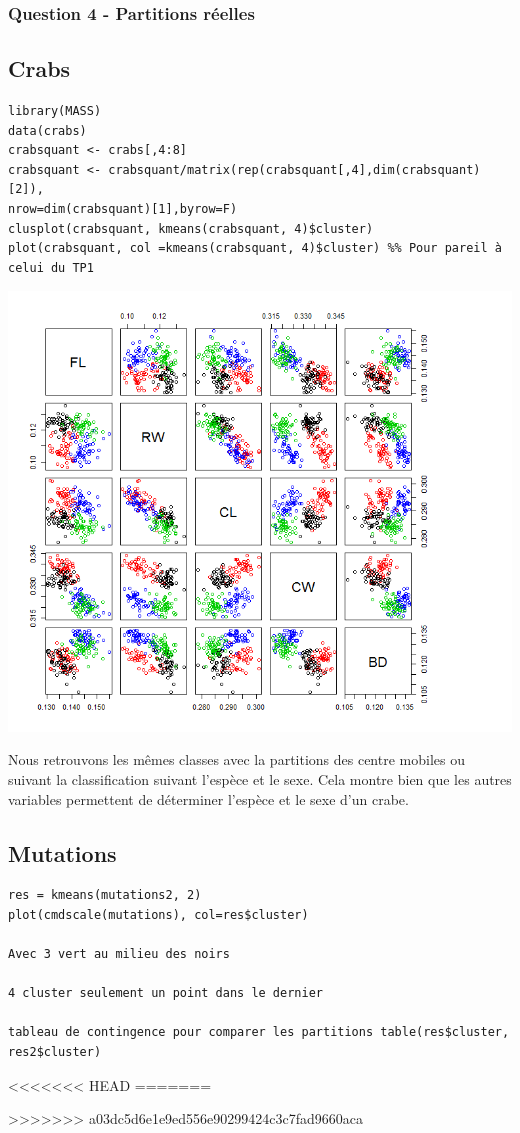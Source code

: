 \documentclass{article}\usepackage[]{graphicx}\usepackage[]{color}
\begin{document}
\subsubsection*{Question 4 - Partitions réelles}


\subsection*{Crabs}
\begin{verbatim}
library(MASS)
data(crabs)
crabsquant <- crabs[,4:8]
crabsquant <- crabsquant/matrix(rep(crabsquant[,4],dim(crabsquant)[2]),
nrow=dim(crabsquant)[1],byrow=F)
clusplot(crabsquant, kmeans(crabsquant, 4)$cluster)
plot(crabsquant, col =kmeans(crabsquant, 4)$cluster) %% Pour pareil à celui du TP1
\end{verbatim}
\includegraphics[width=\textwidth]{ex2.png}

Nous retrouvons les mêmes classes avec la partitions des centre mobiles ou suivant la classification suivant l'espèce et le sexe. Cela montre bien que les autres variables permettent de déterminer l'espèce et le sexe d'un crabe. 

\subsection*{Mutations}
\begin{verbatim}
res = kmeans(mutations2, 2)
plot(cmdscale(mutations), col=res$cluster)

Avec 3 vert au milieu des noirs 

4 cluster seulement un point dans le dernier

tableau de contingence pour comparer les partitions table(res$cluster, res2$cluster)
\end{verbatim}


<<<<<<< HEAD
=======

>>>>>>> a03dc5d6e1e9ed556e90299424c3c7fad9660aca
\end{document}

